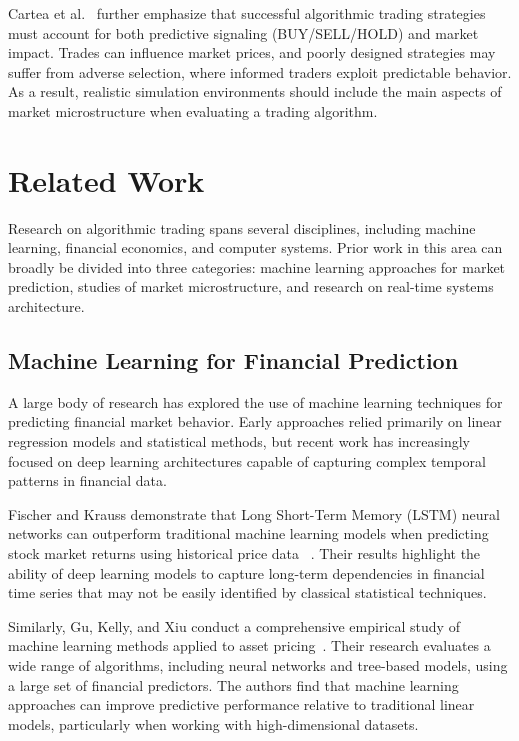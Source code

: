 \documentclass[12pt]{article}
\begin{document}
Cartea et al.~\cite{carteaMicrostructure} further emphasize that successful algorithmic trading strategies must account for both predictive signaling (BUY/SELL/HOLD) and market impact. 
Trades can influence market prices, and poorly designed strategies may suffer from adverse selection, where informed traders exploit predictable behavior. 
As a result, realistic simulation environments should include the main aspects of market microstructure when evaluating a trading algorithm.

\section{Related Work}

Research on algorithmic trading spans several disciplines, including 
machine learning, financial economics, and computer systems. 
Prior work in this area can broadly be divided into three categories: 
machine learning approaches for market prediction, studies of market 
microstructure, and research on real-time systems architecture.

\subsection{Machine Learning for Financial Prediction}

A large body of research has explored the use of machine learning 
techniques for predicting financial market behavior. Early approaches 
relied primarily on linear regression models and statistical methods, 
but recent work has increasingly focused on deep learning architectures 
capable of capturing complex temporal patterns in financial data.

Fischer and Krauss demonstrate that Long Short-Term Memory (LSTM) 
neural networks can outperform traditional machine learning models 
when predicting stock market returns using historical price data 
~\cite{fischer2018lstm}. Their results highlight the ability of deep 
learning models to capture long-term dependencies in financial time 
series that may not be easily identified by classical statistical 
techniques.

Similarly, Gu, Kelly, and Xiu conduct a comprehensive empirical study 
of machine learning methods applied to asset pricing~\cite{gu2020empirical}. 
Their research evaluates a wide range of algorithms, including neural 
networks and tree-based models, using a large set of financial predictors. 
The authors find that machine learning approaches can improve predictive 
performance relative to traditional linear models, particularly when 
working with high-dimensional datasets.
\end{document}
